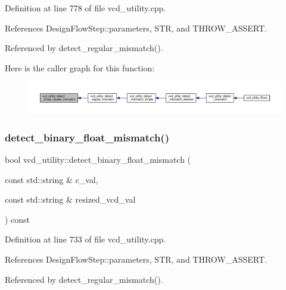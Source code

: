 Definition at line 778 of file vcd\+\_\+utility.\+cpp.



References Design\+Flow\+Step\+::parameters, S\+TR, and T\+H\+R\+O\+W\+\_\+\+A\+S\+S\+E\+RT.



Referenced by detect\+\_\+regular\+\_\+mismatch().

Here is the caller graph for this function\+:
\nopagebreak
\begin{figure}[H]
\begin{center}
\leavevmode
\includegraphics[width=350pt]{d8/d51/classvcd__utility_adb80e05f3d7c891116d8be21c21c84db_icgraph}
\end{center}
\end{figure}
\mbox{\label{classvcd__utility_af72ee3efc398a2cded1b268c1eaf92cd}} 
\subsubsection{\texorpdfstring{detect\+\_\+binary\+\_\+float\+\_\+mismatch()}{detect\_binary\_float\_mismatch()}}
{\footnotesize\ttfamily bool vcd\+\_\+utility\+::detect\+\_\+binary\+\_\+float\+\_\+mismatch (\begin{DoxyParamCaption}\item[{const std\+::string \&}]{c\+\_\+val,  }\item[{const std\+::string \&}]{resized\+\_\+vcd\+\_\+val }\end{DoxyParamCaption}) const\hspace{0.3cm}{\ttfamily [protected]}}



Definition at line 733 of file vcd\+\_\+utility.\+cpp.



References Design\+Flow\+Step\+::parameters, S\+TR, and T\+H\+R\+O\+W\+\_\+\+A\+S\+S\+E\+RT.



Referenced by detect\+\_\+regular\+\_\+mismatch().

